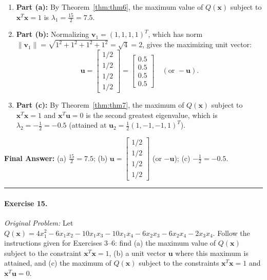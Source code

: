 \documentclass[11pt, letterpaper]{article}
\theoremstyle{definition}
\theoremstyle{remark}
\begin{document}
\begin{enumerate}[leftmargin=2em]
\begin{itemize}
    \end{itemize}
    Since $\mathbf{v}_1, \mathbf{v}_2, \mathbf{v}_3, \mathbf{v}_4$ are four nonzero mutually orthogonal eigenvectors in $\mathbb{R}^4$, we have found the complete spectrum of $A$! Ordering the eigenvalues in the natural real ordering:
    \[
    \lambda_1 = \frac{15}{2} = 7.5 > \lambda_2 = -\frac{1}{2} = -0.5 > \lambda_3 = -\frac{5}{2} = -2.5 > \lambda_4 = -\frac{9}{2} = -4.5.
    \]
    (Trace check: $7.5 - 0.5 - 2.5 - 4.5 = 0 = \operatorname{tr}(A)$.)
    \item \textbf{Part (a):} By Theorem~\ref{thm:thm6}, the maximum value of $Q(\mathbf{x})$ subject to $\mathbf{x}^T \mathbf{x} = 1$ is $\lambda_1 = \frac{15}{2} = 7.5$.
    \item \textbf{Part (b):} Normalizing $\mathbf{v}_1 = (1, 1, 1, 1)^T$, which has norm $\|\mathbf{v}_1\| = \sqrt{1^2 + 1^2 + 1^2 + 1^2} = \sqrt{4} = 2$, gives the maximizing unit vector:
    \[
    \mathbf{u} = \begin{bmatrix} 1/2 \\ 1/2 \\ 1/2 \\ 1/2 \end{bmatrix} = \begin{bmatrix} 0.5 \\ 0.5 \\ 0.5 \\ 0.5 \end{bmatrix} \quad \left(\text{or } -\mathbf{u}\right).
    \]
    \item \textbf{Part (c):} By Theorem~\ref{thm:thm7}, the maximum of $Q(\mathbf{x})$ subject to $\mathbf{x}^T \mathbf{x} = 1$ and $\mathbf{x}^T \mathbf{u} = 0$ is the second greatest eigenvalue, which is $\lambda_2 = -\frac{1}{2} = -0.5$ (attained at $\mathbf{u}_2 = \frac{1}{2}(1, -1, -1, 1)^T$).
\end{enumerate}
\textbf{Final Answer:} (a) $\frac{15}{2} = 7.5$; \quad (b) $\mathbf{u} = \begin{bmatrix} 1/2 \\ 1/2 \\ 1/2 \\ 1/2 \end{bmatrix}$ (or $-\mathbf{u}$); \quad (c) $-\frac{1}{2} = -0.5$.

\medskip
\hrule
\medskip

\paragraph{Exercise 15.}
\emph{Original Problem:} Let $Q(\mathbf{x}) = 4x_1^2 - 6x_1 x_2 - 10x_1 x_3 - 10x_1 x_4 - 6x_2 x_3 - 6x_2 x_4 - 2x_3 x_4$. Follow the instructions given for Exercises 3--6: find (a) the maximum value of $Q(\mathbf{x})$ subject to the constraint $\mathbf{x}^T \mathbf{x} = 1$, (b) a unit vector $\mathbf{u}$ where this maximum is attained, and (c) the maximum of $Q(\mathbf{x})$ subject to the constraints $\mathbf{x}^T \mathbf{x} = 1$ and $\mathbf{x}^T \mathbf{u} = 0$.
\end{document}
